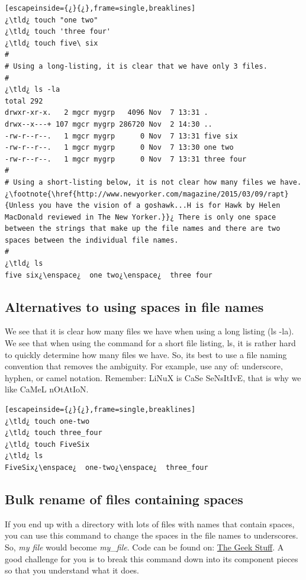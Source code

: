 \begin{lstlisting}[escapeinside={¿}{¿},frame=single,breaklines]
¿\tld¿ touch "one two"
¿\tld¿ touch 'three four'
¿\tld¿ touch five\ six
#
# Using a long-listing, it is clear that we have only 3 files.
#
¿\tld¿ ls -la
total 292
drwxr-xr-x.   2 mgcr mygrp   4096 Nov  7 13:31 .
drwx--x---+ 107 mgcr mygrp 286720 Nov  2 14:30 ..
-rw-r--r--.   1 mgcr mygrp      0 Nov  7 13:31 five six
-rw-r--r--.   1 mgcr mygrp      0 Nov  7 13:30 one two
-rw-r--r--.   1 mgcr mygrp      0 Nov  7 13:31 three four
#
# Using a short-listing below, it is not clear how many files we have.¿\footnote{\href{http://www.newyorker.com/magazine/2015/03/09/rapt}{Unless you have the vision of a goshawk...H is for Hawk by Helen MacDonald reviewed in The New Yorker.}}¿ There is only one space between the strings that make up the file names and there are two spaces between the individual file names.
#
¿\tld¿ ls
five six¿\enspace¿  one two¿\enspace¿  three four

\end{lstlisting}

\subsection{Alternatives to using spaces in file names}

We see that it is clear how many files we have when using a long listing (ls -la). We see that when using the command for a short file listing, ls, it is rather hard to quickly determine how many files we have. So, its best to use a file naming convention that removes the ambiguity. For example, use any of: underscore, hyphen, or camel notation. Remember: LiNuX is CaSe SeNsItIvE, that is why we like CaMeL nOtAtIoN.

\begin{lstlisting}[escapeinside={¿}{¿},frame=single,breaklines]
¿\tld¿ touch one-two
¿\tld¿ touch three_four
¿\tld¿ touch FiveSix
¿\tld¿ ls
FiveSix¿\enspace¿  one-two¿\enspace¿  three_four
\end{lstlisting}

\subsection{Bulk rename of files containing spaces}

If you end up with a directory with lots of files with names that contain spaces, you can use this command to change the spaces in the file names to underscores. So, \textsl{my file} would become \textsl{my\_file}. Code can be found on:  
\href{http://www.thegeekstuff.com/2009/06/15-practical-unix-linux-find-command-examples-part-2/}{The Geek Stuff}. A good challenge for you is to break this command down into its component pieces so that you understand what it does.

